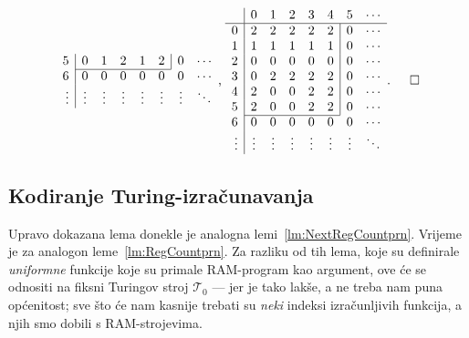 \begin{primjer}[{name=[kodirana tablica prijelaza]}]
\begin{equation*}
\begin{array}{r|ccccccc}
5& 0 & 1 & 2 & 1 & 2 & \multicolumn{1}{|c}{0} & \cdots\\ \cline{2-6}
6& 0 & 0 & 0 & 0 & 0 & 0 & \cdots\\
\vdots&\vdots&\vdots&\vdots&\vdots&\vdots&\vdots&\ddots
\end{array}\text,\;
\begin{array}{r|ccccccc}
    &0&1&2&3&4&5&\cdots\\\hline
0& 2 & 2 & 2 & 2 & 2 & \multicolumn{1}{|c}{0} & \cdots\\
1& 1 & 1 & 1 & 1 & 1 & \multicolumn{1}{|c}{0} & \cdots\\
2& 0 & 0 & 0 & 0 & 0 & \multicolumn{1}{|c}{0} & \cdots\\
3& 0 & 2 & 2 & 2 & 2 & \multicolumn{1}{|c}{0} & \cdots\\
4& 2 & 0 & 0 & 2 & 2 & \multicolumn{1}{|c}{0} & \cdots\\
5& 2 & 0 & 0 & 2 & 2 & \multicolumn{1}{|c}{0} & \cdots\\ \cline{2-6}
6& 0 & 0 & 0 & 0 & 0 & 0 & \cdots\\
\vdots&\vdots&\vdots&\vdots&\vdots&\vdots&\vdots&\ddots
\end{array}\text.\!\!\!\qedhere
\end{equation*}
\end{primjer}

\subsection{Kodiranje Turing-izračunavanja}

Upravo dokazana lema donekle je analogna lemi~\ref{lm:NextRegCountprn}. Vrijeme je za analogon leme~\ref{lm:RegCountprn}. Za razliku od tih lema, koje su definirale \emph{uniformne} funkcije koje su primale RAM-program kao argument, ove će se odnositi na fiksni Turingov stroj $\mathcal T_0$ --- jer je tako lakše, a ne treba nam puna općenitost; sve što će nam kasnije trebati su \emph{neki} indeksi izračunljivih funkcija, a njih smo dobili s RAM-strojevima.

